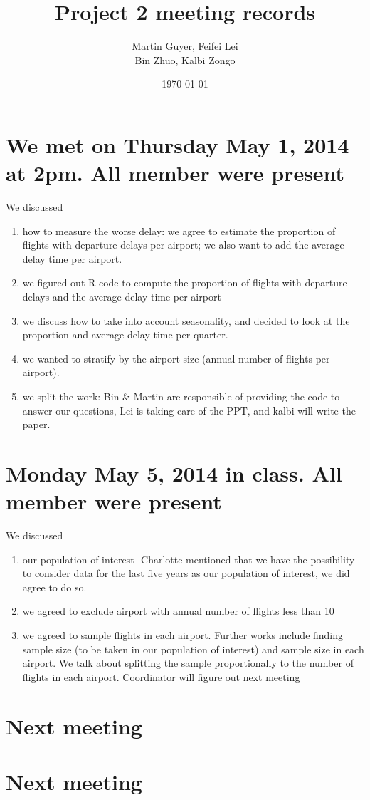 \documentclass[12]{article}
\title{Project 2 meeting records}
\author{Martin Guyer,  Feifei  Lei \\ Bin Zhuo, Kalbi Zongo}
\date{\today}
\begin{document}
\maketitle

\section{We met on Thursday May 1, 2014 at 2pm. All member were present}

We discussed\\
\begin{enumerate}


\item how to measure the worse delay: we agree to estimate the proportion of flights with departure delays per airport; we also want to add the average delay time per airport.


\item we figured out R code to compute the proportion of flights with departure delays and the average delay time per airport


\item we discuss how to take into account seasonality, and decided to look at the proportion and average delay time per quarter.


\item we wanted to stratify by the airport size (annual number of flights per airport).


\item we split the work: Bin \& Martin are responsible of providing the code to answer our questions, Lei is taking care of the PPT, and kalbi will write the paper.
\end{enumerate}

\section{Monday May 5, 2014 in class. All member were present}
We discussed\\
\begin{enumerate}
\item our population of interest- Charlotte mentioned that we have the possibility to consider data for  the last five years as our population of interest, we did agree to do so.
\item we agreed to exclude airport with annual number of flights less than 10
\item we agreed to sample flights in each airport. Further works include finding sample size (to be taken in our population of interest) and sample size in each airport. We talk about splitting the sample proportionally to the number of flights in each airport. 
Coordinator will figure out next meeting
\end{enumerate}

\section{Next meeting}




\section{Next meeting}
\end{document}
